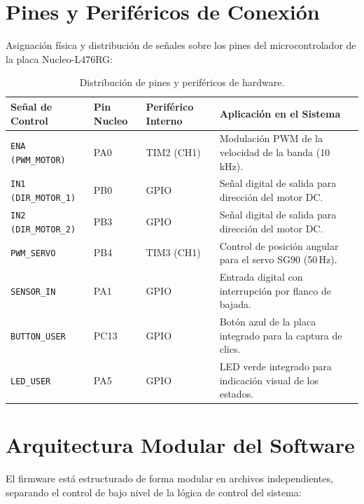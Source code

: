 \documentclass[12pt, letterpaper]{article}
\begin{document}
\clearpage

\section{Pines y Periféricos de Conexión}
\label{sec:pines_perifericos_tentativos}

Asignación física y distribución de señales sobre los pines del microcontrolador de la placa Nucleo-L476RG:

\vspace{0.3cm}

\begin{table}[H]
\centering
\renewcommand{\arraystretch}{1.2}
\caption{Distribución de pines y periféricos de hardware.}
\label{tab:pines_perifericos}
\vspace{0.3cm}
\begin{tabularx}{\textwidth}{lXXX}
\toprule
\textbf{Señal de Control} & \textbf{Pin Nucleo} & \textbf{Periférico Interno} & \textbf{Aplicación en el Sistema} \\
\midrule
\texttt{ENA (PWM\_MOTOR)} & PA0 & TIM2 (CH1) & Modulación PWM de la velocidad de la banda (10\,kHz). \\
\midrule
\texttt{IN1 (DIR\_MOTOR\_1)} & PB0 & GPIO & Señal digital de salida para dirección del motor DC. \\
\midrule
\texttt{IN2 (DIR\_MOTOR\_2)} & PB3 & GPIO & Señal digital de salida para dirección del motor DC. \\
\midrule
\texttt{PWM\_SERVO} & PB4 & TIM3 (CH1) & Control de posición angular para el servo SG90 (50\,Hz). \\
\midrule
\texttt{SENSOR\_IN} & PA1 & GPIO & Entrada digital con interrupción por flanco de bajada. \\
\midrule
\texttt{BUTTON\_USER} & PC13 & GPIO & Botón azul de la placa integrado para la captura de clics. \\
\midrule
\texttt{LED\_USER} & PA5 & GPIO & LED verde integrado para indicación visual de los estados. \\
\bottomrule
\end{tabularx}
\end{table}

\clearpage

\section{Arquitectura Modular del Software}
\label{sec:arquitectura_software}

El firmware está estructurado de forma modular en archivos independientes, separando el control de bajo nivel de la lógica de control del sistema:
\end{document}
